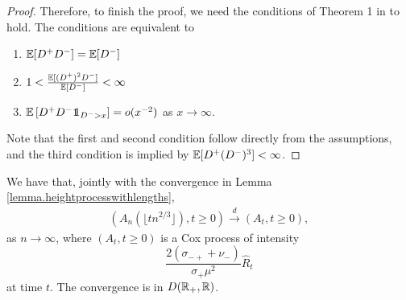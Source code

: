 \begin{proof}
Therefore, to finish the proof, we need the conditions of Theorem 1 in \cite{deraphelisScalingLimitMultitype2017} to hold. The conditions are equivalent to 
\begin{enumerate}
    \item ${\mathbb E}[D^+D^-]={\mathbb E}[D^-]$
    \item $1<\frac{{\mathbb E}[(D^+)^2D^-]}{{\mathbb E}[D^-]}<\infty$
    \item $\E\left[D^+D^-\one_{D^->x}\right]=o(x^{-2})$ as $x\to \infty$. 
\end{enumerate}
Note that the first and second condition follow directly from the assumptions, and the third condition is implied by ${\mathbb E}[D^+(D^-)^3]<\infty$.
\end{proof}



\begin{proposition}\label{prop.convergenceancestraledges}
We have that, jointly with the convergence in Lemma \ref{lemma.heightprocesswithlengths},
\begin{align*}\left(A_n\left(\lfloor tn^{2/3}\rfloor\right),t\geq 0\right)\overset{d}{\to}\left(A_t,t\geq 0\right),\end{align*}
as $n\to \infty$, where $(A_t,t\geq 0)$ is a Cox process of intensity $$\frac{2(\sigma_{-+}+\nu_-)}{\sigma_+\mu^2} \hat{R}_t$$ at time $t$. The convergence is in $D({\mathbb R}_+,{\mathbb R})$.
\end{proposition}


